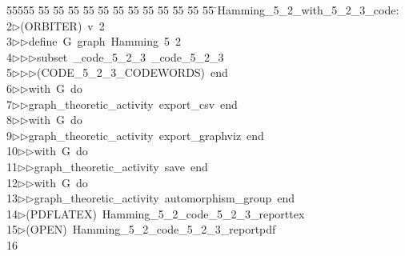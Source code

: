%
%
\begin{tabbing}
55555 \= 55 \= 55 \= 55 \= 55 \= 55 \= 55 \= 55 \= 55 \= 55 \= 55 \= 55 \= 55 \= \>Hamming\_5\_2\_with\_5\_2\_3\_code:\\[0pt]
2\>$\triangleright$\>(ORBITER)\ v\ 2\ \\[0pt]
3\>$\triangleright$\>$\triangleright$\>define\ G\ graph\ Hamming\ 5\ 2\ \\[0pt]
4\>$\triangleright$\>$\triangleright$\>$\triangleright$\>subset\ \_code\_5\_2\_3\ \_code\_5\_2\_3\ \\[0pt]
5\>$\triangleright$\>$\triangleright$\>$\triangleright$\>(CODE\_5\_2\_3\_CODEWORDS)\ end\ \\[0pt]
6\>$\triangleright$\>$\triangleright$\>with\ G\ do\ \\[0pt]
7\>$\triangleright$\>$\triangleright$\>graph\_theoretic\_activity\ export\_csv\ end\ \\[0pt]
8\>$\triangleright$\>$\triangleright$\>with\ G\ do\ \\[0pt]
9\>$\triangleright$\>$\triangleright$\>graph\_theoretic\_activity\ export\_graphviz\ end\ \\[0pt]
10\>$\triangleright$\>$\triangleright$\>with\ G\ do\ \\[0pt]
11\>$\triangleright$\>$\triangleright$\>graph\_theoretic\_activity\ save\ end\ \\[0pt]
12\>$\triangleright$\>$\triangleright$\>with\ G\ do\ \\[0pt]
13\>$\triangleright$\>$\triangleright$\>graph\_theoretic\_activity\ automorphism\_group\ end\\[0pt]
14\>$\triangleright$\>(PDFLATEX)\ Hamming\_5\_2\_code\_5\_2\_3\_reporttex\\[0pt]
15\>$\triangleright$\>(OPEN)\ Hamming\_5\_2\_code\_5\_2\_3\_reportpdf\\[0pt]
16\>\end{tabbing}
